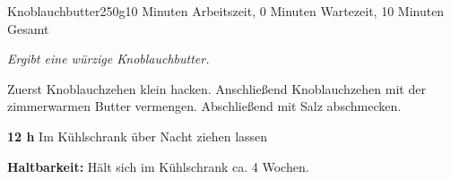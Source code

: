 \begin{recipe}{Knoblauchbutter}{250g}{10 Minuten Arbeitszeit, 0 Minuten Wartezeit, 10 Minuten Gesamt}

  \freeform{}\textit{Ergibt eine würzige Knoblauchbutter.}


  Zuerst Knoblauchzehen klein hacken.
  Anschließend Knoblauchzehen mit der zimmerwarmen Butter vermengen.
  Abschließend mit Salz abschmecken.

  \newstep{}\textbf{12 h}
  Im Kühlschrank über Nacht ziehen lassen

  \freeform{}\hrulefill{}

  \freeform{}\textbf{Haltbarkeit:}
  Hält sich im Kühlschrank ca. 4 Wochen.

\end{recipe}
